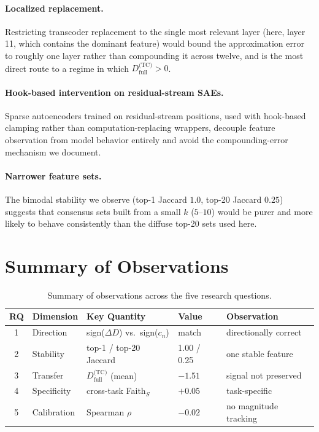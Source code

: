 \documentclass{article}
\begin{document}
\paragraph{Localized replacement.}
Restricting transcoder replacement to the single most relevant layer (here,
layer 11, which contains the dominant feature) would bound the approximation
error to roughly one layer rather than compounding it across twelve, and is the
most direct route to a regime in which $D_\text{full}^\text{(TC)} > 0$.

\paragraph{Hook-based intervention on residual-stream SAEs.}
Sparse autoencoders trained on residual-stream positions, used with hook-based
clamping rather than computation-replacing wrappers, decouple feature
observation from model behavior entirely and avoid the compounding-error
mechanism we document.

\paragraph{Narrower feature sets.}
The bimodal stability we observe (top-1 Jaccard $1.0$, top-20 Jaccard $0.25$)
suggests that consensus sets built from a small $k$ ($5$--$10$) would be purer
and more likely to behave consistently than the diffuse top-20 sets used here.

\section{Summary of Observations}

\begin{table}[h]
\centering
\caption{Summary of observations across the five research questions.}
\label{tab:summary}
\begin{tabular}{cllll}
\toprule
RQ & Dimension & Key Quantity & Value & Observation \\
\midrule
1 & Direction    & sign($\Delta D$) vs.\ sign($c_n$) & match & directionally correct \\
2 & Stability    & top-1 / top-20 Jaccard            & 1.00 / 0.25 & one stable feature \\
3 & Transfer     & $D_\text{full}^\text{(TC)}$ (mean) & $-1.51$ & signal not preserved \\
4 & Specificity  & cross-task Faith$_S$              & $+0.05$ & task-specific \\
5 & Calibration  & Spearman $\rho$                   & $-0.02$ & no magnitude tracking \\
\bottomrule
\end{tabular}
\end{table}
\end{document}
